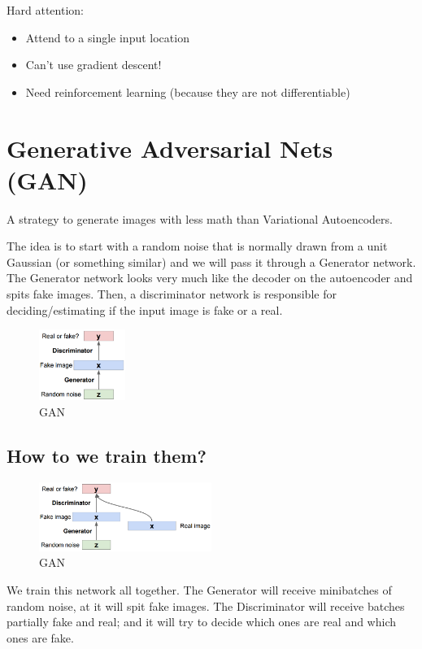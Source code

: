 \documentclass{article}
\begin{document}
	Hard attention:
	\begin{itemize}
		\item Attend to a single input location
		\item Can’t use gradient descent!
		\item Need reinforcement learning (because they are not differentiable)
	\end{itemize}

	\section{Generative Adversarial Nets (GAN)}
	A strategy to generate images with less math than Variational Autoencoders.
	
	The idea is to start with a random noise that is normally drawn from a unit Gaussian (or something similar) and we will pass it through a Generator network. The Generator network looks very much like the decoder on the autoencoder and spits fake images. Then, a discriminator network is responsible for deciding/estimating if the input image is fake or a real.
	
	\begin{figure}[!htb]
		\centering
		\includegraphics[width=0.25\textwidth]{Images/gans/8.png}
		\caption{GAN}
	\end{figure}
	
	\subsection*{How to we train them?}
	\begin{figure}[!htb]
		\centering
		\includegraphics[width=0.5\textwidth]{Images/gans/7.png}
		\caption{GAN}
	\end{figure}
	We train this network all together. The Generator will receive minibatches of random noise, at it will spit fake images. The Discriminator will receive batches partially fake and real; and it will try to decide which ones are real and which ones are fake.
	
\end{document}
